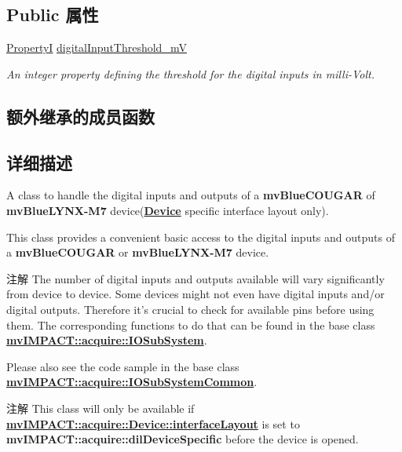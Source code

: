 \subsection*{Public 属性}
\begin{DoxyCompactItemize}
\item 
\hyperlink{group___common_interface_ga12d5e434238ca242a1ba4c6c3ea45780}{Property\+I} \hyperlink{classmv_i_m_p_a_c_t_1_1acquire_1_1_i_o_sub_system_blue_c_o_u_g_a_r_ac88f543939c57dd490abbeda9dab2a9c}{digital\+Input\+Threshold\+\_\+m\+V}
\begin{DoxyCompactList}\small\item\em An integer property defining the threshold for the digital inputs in milli-\/\+Volt. \end{DoxyCompactList}\end{DoxyCompactItemize}
\subsection*{额外继承的成员函数}


\subsection{详细描述}
A class to handle the digital inputs and outputs of a {\bfseries mv\+Blue\+C\+O\+U\+G\+A\+R} of {\bfseries mv\+Blue\+L\+Y\+N\+X-\/\+M7} device({\bfseries \hyperlink{classmv_i_m_p_a_c_t_1_1acquire_1_1_device}{Device}} specific interface layout only). 

This class provides a convenient basic access to the digital inputs and outputs of a {\bfseries mv\+Blue\+C\+O\+U\+G\+A\+R} or {\bfseries mv\+Blue\+L\+Y\+N\+X-\/\+M7} device.

\begin{DoxyNote}{注解}
The number of digital inputs and outputs available will vary significantly from device to device. Some devices might not even have digital inputs and/or digital outputs. Therefore it's crucial to check for available pins before using them. The corresponding functions to do that can be found in the base class {\bfseries \hyperlink{classmv_i_m_p_a_c_t_1_1acquire_1_1_i_o_sub_system}{mv\+I\+M\+P\+A\+C\+T\+::acquire\+::\+I\+O\+Sub\+System}}.
\end{DoxyNote}
Please also see the code sample in the base class {\bfseries \hyperlink{classmv_i_m_p_a_c_t_1_1acquire_1_1_i_o_sub_system_common}{mv\+I\+M\+P\+A\+C\+T\+::acquire\+::\+I\+O\+Sub\+System\+Common}}.

\begin{DoxyNote}{注解}
This class will only be available if {\bfseries \hyperlink{classmv_i_m_p_a_c_t_1_1acquire_1_1_device_ab4dd0ecc9d456bb5ddc01d844c9d6f2d}{mv\+I\+M\+P\+A\+C\+T\+::acquire\+::\+Device\+::interface\+Layout}} is set to {\bfseries mv\+I\+M\+P\+A\+C\+T\+::acquire\+::dil\+Device\+Specific} before the device is opened. 
\end{DoxyNote}


